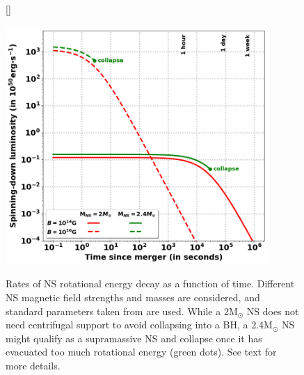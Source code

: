 \documentclass[12pt,onecolumn]{article}
\makeatletter
\newcommand*{\ns}{NS\@\xspace}
\newcommand*{\bh}{BH\@\xspace}
\makeatother
\begin{document}
\begin{figure}[!h]
\vspace*{0.3cm}
[\FBwidth]
{\caption{Rates of \ns rotational energy decay as a function of time. Different \ns magnetic field strengths and masses are considered, and standard parameters taken from \cite{Metzger2017} are used. While a 2M$_{\odot}$ \ns does not need centrifugal support to avoid collapsing into a \bh, a 2.4M$_{\odot}$ \ns might qualify as a supramassive \ns and collapse once it has evacuated too much rotational energy (green dots). See text for more details.}\label{fig:spinning_down}}
{\includegraphics[width=10cm]{Figures/spinning-down_luminosity.png}}
\vspace*{-0.4cm}
\end{figure}

\vspace*{-1.2cm}
\setlength\bibitemsep{0pt}
%
%

%
\printbibliography
\end{document}
